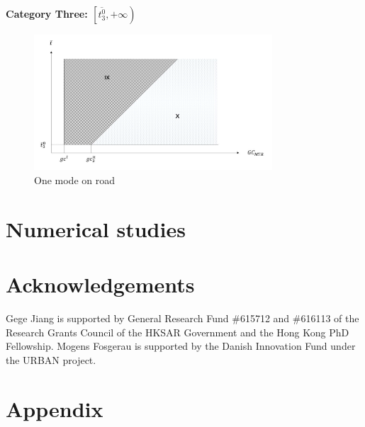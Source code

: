 \documentclass[a4paper,11pt]{article}
\begin{document}
\textbf{Category Three: $\left[\overline{t^0_3}, +\infty\right)$}

\begin{figure}
	\centering
	\includegraphics[width=3.5in]{image/One-mode.jpg}
	\caption{One mode on road}
	\label{fig:One-mode cases}
\end{figure}


\section{Numerical studies} \label{Numerical studies}




\section{Acknowledgements}
Gege Jiang is supported by General Research Fund \#615712 and \#616113 of the Research Grants Council of the HKSAR Government and the Hong Kong PhD Fellowship. Mogens Fosgerau is supported by the Danish Innovation Fund under the URBAN project.




\appendix{}



\section{Appendix}
\end{document}
